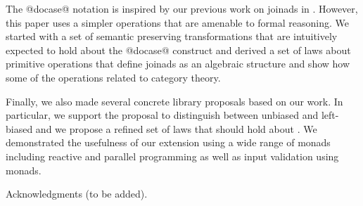 \documentclass[preprint]{sigplanconf}
\begin{document}
The @docase@ notation is inspired by our previous work on joinads in \fsharp. However, this paper
uses a simpler operations that are amenable to formal reasoning. We started with a set of semantic preserving
transformations that are intuitively expected to hold about the @docase@ construct and derived a set
of laws about primitive operations that define joinads as an algebraic structure and show how some 
of the operations related to category theory.

Finally, we also made several concrete library proposals based on our work. In particular, we support
the proposal to distinguish between unbiased  and left-biased  and we
propose a refined set of laws that should hold about . We demonstrated the
usefulness of our extension using a wide range of monads including reactive and parallel programming
as well as input validation using monads. 


\acks
Acknowledgments (to be added).

\end{document}
